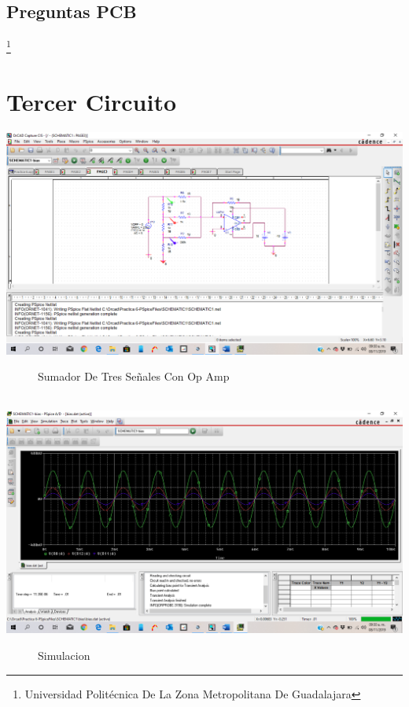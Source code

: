 \documentclass[10pt,a4paper]{article}
\begin{document}
\subsection{Preguntas PCB}













\footnote{Universidad Politécnica De La Zona Metropolitana De Guadalajara} 

\newpage

\section{Tercer Circuito}
\begin{center}
 \includegraphics[scale=0.3]{5.png}
 \begin{figure}[hbtp]
 \caption{Sumador De Tres Señales Con Op Amp}
 \centering
 \end{figure}\\
  \includegraphics[scale=0.3]{6.png}
 \begin{figure}[hbtp]
 \caption{Simulacion}
 \centering
 \end{figure} 
\end{center}
\end{document}
